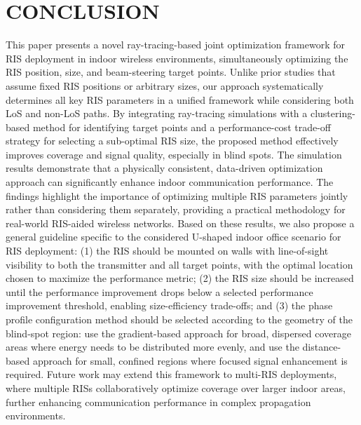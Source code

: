 \documentclass{IEEEoj}
\begin{document}
\section{CONCLUSION} \label{sec:conclusion}
This paper presents a novel ray-tracing-based joint optimization framework for RIS deployment in indoor wireless environments, simultaneously optimizing the RIS position, size, and beam-steering target points. Unlike prior studies that assume fixed RIS positions or arbitrary sizes, our approach systematically determines all key RIS parameters in a unified framework while considering both LoS and non-LoS paths. By integrating ray-tracing simulations with a clustering-based method for identifying target points and a performance-cost trade-off strategy for selecting a sub-optimal RIS size, the proposed method effectively improves coverage and signal quality, especially in blind spots. The simulation results demonstrate that a physically consistent, data-driven optimization approach can significantly enhance indoor communication performance. The findings highlight the importance of optimizing multiple RIS parameters jointly rather than considering them separately, providing a practical methodology for real-world RIS-aided wireless networks. Based on these results, we also propose a general guideline specific to the considered U-shaped indoor office scenario for RIS deployment: (1) the RIS should be mounted on walls with line-of-sight visibility to both the transmitter and all target points, with the optimal location chosen to maximize the performance metric; (2) the RIS size should be increased until the performance improvement drops below a selected performance improvement threshold, enabling size-efficiency trade-offs; and (3) the phase profile configuration method should be selected according to the geometry of the blind-spot region: use the gradient-based approach for broad, dispersed coverage areas where energy needs to be distributed more evenly, and use the distance-based approach for small, confined regions where focused signal enhancement is required. Future work may extend this framework to multi-RIS deployments, where multiple RISs collaboratively optimize coverage over larger indoor areas, further enhancing communication performance in complex propagation environments.
\end{document}
